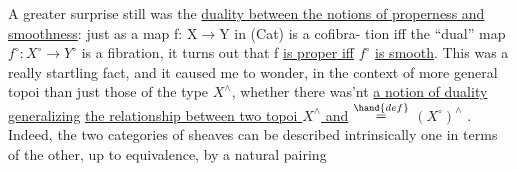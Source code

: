 A  greater surprise still was the \uline{duality between the notions of
properness and smoothness}: just as a map f: X$\longrightarrow$Y in (Cat) is a cofibra-%
tion iff the ``dual'' map $f^{\circ}: X^{\circ}\longrightarrow Y^{\circ}$ is a fibration, it turns out that
f \uline{is proper iff} $f^{\circ}$ \uline{is smooth}. This was a really startling fact, and it
caused me to wonder, in the context of more general topoi than just those
of the type $X^{\wedge}$, whether there was'nt \uline{a notion of duality generalizing}
\uline{the relationship between two topoi $X^{\wedge}$ and}  $\overset{\hand{def}}{=}$ $(X^{\circ})^{\wedge}$ . Indeed, the
two categories of sheaves can be described intrinsically one in terms of
the other, up to equivalence, by a natural pairing

